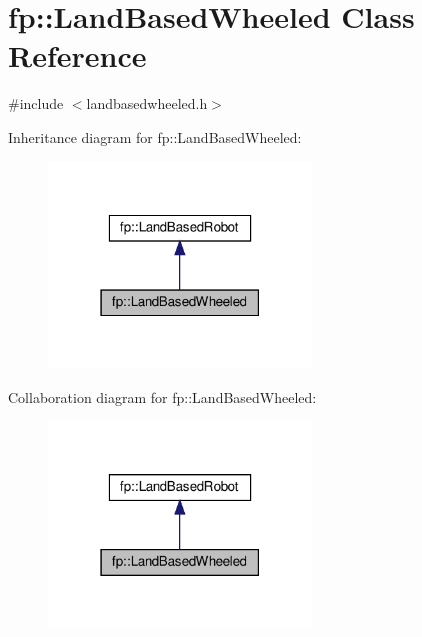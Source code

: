 \hypertarget{classfp_1_1_land_based_wheeled}{}\section{fp\+:\+:Land\+Based\+Wheeled Class Reference}
\label{classfp_1_1_land_based_wheeled}


{\ttfamily \#include $<$landbasedwheeled.\+h$>$}



Inheritance diagram for fp\+:\+:Land\+Based\+Wheeled\+:\nopagebreak
\begin{figure}[H]
\begin{center}
\leavevmode
\includegraphics[width=198pt]{classfp_1_1_land_based_wheeled__inherit__graph}
\end{center}
\end{figure}


Collaboration diagram for fp\+:\+:Land\+Based\+Wheeled\+:\nopagebreak
\begin{figure}[H]
\begin{center}
\leavevmode
\includegraphics[width=198pt]{classfp_1_1_land_based_wheeled__coll__graph}
\end{center}
\end{figure}
